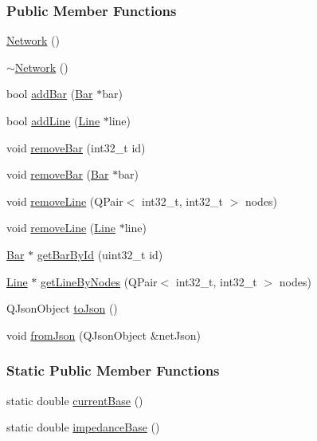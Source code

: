 \subsubsection*{Public Member Functions}
\begin{DoxyCompactItemize}
\item 
\hyperlink{group___graphics_ga3cc2fb4f8fa4d507077e8da85ce5a1c8}{Network} ()
\item 
\hyperlink{group___graphics_ga7a4e19cdb4bf0c7ecf82baa643831492}{$\sim$\+Network} ()
\item 
bool \hyperlink{group___graphics_ga8c5dfef0216731246f7411e1a5fbee01}{add\+Bar} (\hyperlink{class_bar}{Bar} $\ast$bar)
\item 
bool \hyperlink{group___graphics_gae02945131494987b3ff9b59b627719b4}{add\+Line} (\hyperlink{class_line}{Line} $\ast$line)
\item 
void \hyperlink{group___graphics_ga997ce4f03d316b9f138f2e64e6ca400c}{remove\+Bar} (int32\+\_\+t id)
\item 
void \hyperlink{group___graphics_ga7dea7690987c58fa61ffaa0326b68b68}{remove\+Bar} (\hyperlink{class_bar}{Bar} $\ast$bar)
\item 
void \hyperlink{group___graphics_ga1eef3317224a7a06348fce07e581a9ad}{remove\+Line} (Q\+Pair$<$ int32\+\_\+t, int32\+\_\+t $>$ nodes)
\item 
void \hyperlink{group___graphics_ga4fd51288aa75614593977ce8aab9100f}{remove\+Line} (\hyperlink{class_line}{Line} $\ast$line)
\item 
\hyperlink{class_bar}{Bar} $\ast$ \hyperlink{group___graphics_ga04d524ce0fa0dd0d06deda92b1597af0}{get\+Bar\+By\+Id} (uint32\+\_\+t id)
\item 
\hyperlink{class_line}{Line} $\ast$ \hyperlink{group___graphics_ga8f090b85a7779695cb9f05b6395b3044}{get\+Line\+By\+Nodes} (Q\+Pair$<$ int32\+\_\+t, int32\+\_\+t $>$ nodes)
\item 
Q\+Json\+Object \hyperlink{group___graphics_ga1bb9773d3935eefef84136d388786494}{to\+Json} ()
\item 
void \hyperlink{group___graphics_ga2aef0f6c0d9569ec4d6b948d1ef0d5f1}{from\+Json} (Q\+Json\+Object \&net\+Json)
\end{DoxyCompactItemize}
\subsubsection*{Static Public Member Functions}
\begin{DoxyCompactItemize}
\item 
static double \hyperlink{group___graphics_ga433bc5c32cf2ce5329bb40b21952d885}{current\+Base} ()
\item 
static double \hyperlink{group___graphics_gae6794c93d37df113778c37c2c702f6d9}{impedance\+Base} ()
\end{DoxyCompactItemize}
